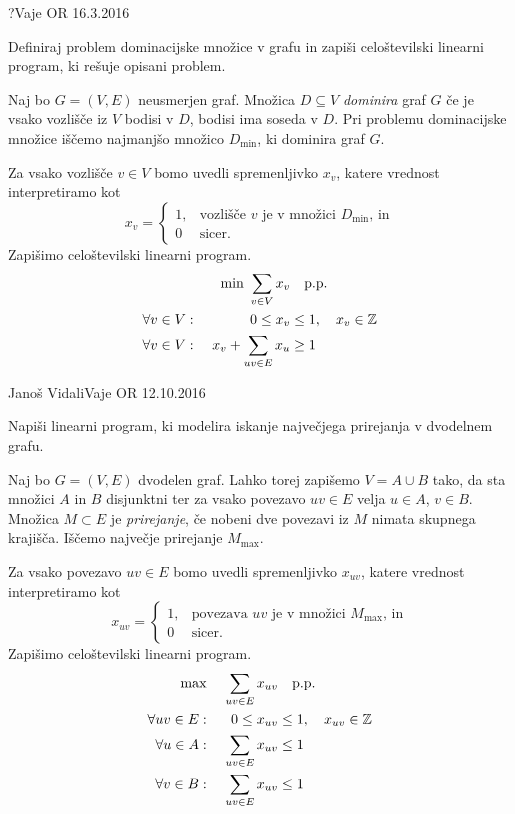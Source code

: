 \begin{naloga}{?}{Vaje OR 16.3.2016}
\begin{vprasanje}[dominacija]
Definiraj problem dominacijske množice v grafu
in zapiši celoštevilski linearni program,
ki rešuje opisani problem.
\end{vprasanje}

\begin{odgovor}
Naj bo $G = (V, E)$ neusmerjen graf.
Množica $D \subseteq V$ {\em dominira} graf $G$
če je vsako vozlišče iz $V$ bodisi v $D$, bodisi ima soseda v $D$.
Pri problemu dominacijske množice iščemo najmanjšo množico $D_{\min}$,
ki dominira graf $G$.

Za vsako vozlišče $v \in V$ bomo uvedli spremenljivko $x_v$,
katere vrednost interpretiramo kot
$$
x_v = \begin{cases}
1, & \text{vozlišče $v$ je v množici $D_{\min}$, in} \\
0  & \text{sicer.}
\end{cases}
$$
Zapišimo celoštevilski linearni program.
\begin{alignat*}{2}
&& \min \ \sum_{v \in V} x_v &\quad \text{p.p.} \\
\forall v \in V: &\ & 0 \le x_v &\le 1, \quad x_v \in \mathbb{Z} \\
\forall v \in V: &\ & x_v + \sum_{uv \in E} x_u &\ge 1
\end{alignat*}
\end{odgovor}
\end{naloga}


\begin{naloga}{Janoš Vidali}{Vaje OR 12.10.2016}
\begin{vprasanje}[maxprirejanje]
Napiši linearni program,
ki modelira iskanje največjega prirejanja v dvodelnem grafu.
\end{vprasanje}

\begin{odgovor}
Naj bo $G = (V, E)$ dvodelen graf.
Lahko torej zapišemo $V = A \cup B$ tako,
da sta množici $A$ in $B$ disjunktni
ter za vsako povezavo $uv \in E$ velja $u \in A$, $v \in B$.
Množica $M \subset E$ je {\em prirejanje},
če nobeni dve povezavi iz $M$ nimata skupnega krajišča.
Iščemo največje prirejanje $M_{\max}$.

Za vsako povezavo $uv \in E$ bomo uvedli spremenljivko $x_{uv}$,
katere vrednost interpretiramo kot
$$
x_{uv} = \begin{cases}
1, & \text{povezava $uv$ je v množici $M_{\max}$, in} \\
0  & \text{sicer.}
\end{cases}
$$
Zapišimo celoštevilski linearni program.
\begin{alignat*}{2}
\max &\ & \sum_{uv \in E} x_{uv} &\quad \text{p.p.} \\
\forall uv \in E: &\ & 0 \le x_{uv} &\le 1, \quad x_{uv} \in \mathbb{Z} \\
\forall u \in A: &\ & \sum_{uv \in E} x_{uv} &\le 1 \\
\forall v \in B: &\ & \sum_{uv \in E} x_{uv} &\le 1
\end{alignat*}
\end{odgovor}
\end{naloga}


